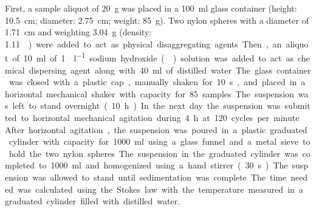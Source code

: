 First, a sample aliquot of \SI{20}{\gram} was placed in a \SI{100}{\milli\litre} glass container 
(height: \SI{10.5}{\centi\metre}; diameter: \SI{2.75}{\centi\metre}; weight: \SI{85}{\gram}). Two nylon
spheres with a diameter of \SI{1.71}{\centi\metre} and weighting \SI{3.04}{\gram} (density: 
\SI{1.11}{\gram\per\centi\metre\cubic}) were added to act as physical disaggregating agents. Then, an 
aliquot of \SI{10}{\milli\litre} of \SI{1}{\molle\per\litre} sodium hydroxide () solution was 
added to act as chemical dispersing agent along with \SI{40}{\milli\litre} of distilled water. The glass 
container was closed with a plastic cap, manually shaken for \SI{10}{\second}, and placed in a horizontal
mechanical shaker with capacity for \num{85}~samples. The suspension was left to stand overnight 
(\SI{10}{\hour}). In the next day the suspension was submitted to horizontal mechanical agitation during 
\SI{4}{\hour} at \si{120} cycles per minute \cite{SuzukiEtAl2004,SuzukiEtAl2004a}.

After horizontal agitation, the suspension was poured in a plastic graduated cylinder with capacity for 
\SI{1000}{\milli\litre} using a glass funnel and a metal sieve to hold the two nylon spheres. The 
suspension in the graduated cylinder was completed to \SI{1000}{\milli\litre} and homogenized using a
hand stirrer (\SI{30}{\second}). The suspension was allowed to stand until sedimentation was complete. 
The time needed was calculated using the Stokes law with the temperature measured in a graduated cylinder 
filled with distilled water.


